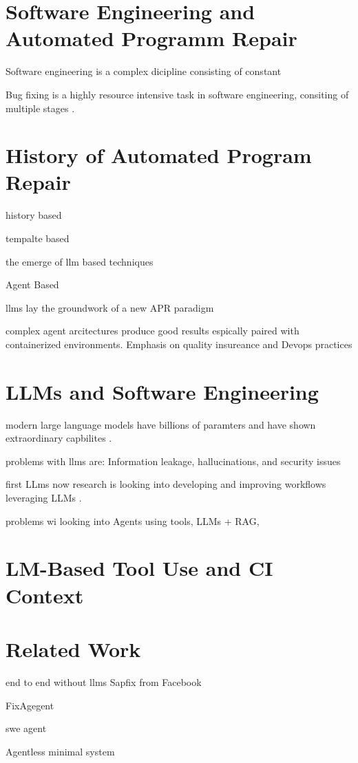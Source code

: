 \section{Software Engineering and Automated Programm Repair}
Software engineering is a complex dicipline consisting of constant

Bug fixing is a highly resource intensive task in software engineering, consiting of multiple stages . 
\section{History of Automated Program Repair}



history based

tempalte based

the emerge of llm based techniques

Agent Based

llms lay the groundwork of a new APR paradigm \cite{chenUnveilingPitfallsUnderstanding2025}

complex agent arcitectures produce good results espically paired with containerized environments. Emphasis on quality insureance and Devops practices \cite{puvvadiCodingAgentsComprehensive2025}


\section{LLMs and Software Engineering}

modern large language models have billions of paramters and have shown extraordinary capbilites \cite{chenUnveilingPitfallsUnderstanding2025}.

problems with llms are: Information leakage, hallucinations, and security issues

first LLms now research is looking into developing and improving workflows leveraging LLMs \cite{puvvadiCodingAgentsComprehensive2025}.

problems wi
looking into Agents using tools, LLMs + RAG,

\section{LM-Based Tool Use and CI Context}

\section{Related Work}


end to end without llms Sapfix from Facebook \cite{margineanSapFixAutomatedEndtoEnd2019}

FixAgegent \cite{leeUnifiedDebuggingApproach2024}

swe agent \cite{yangSWEagentAgentComputerInterfaces2024}

Agentless minimal system \cite{xiaAgentlessDemystifyingLLMbased2024}